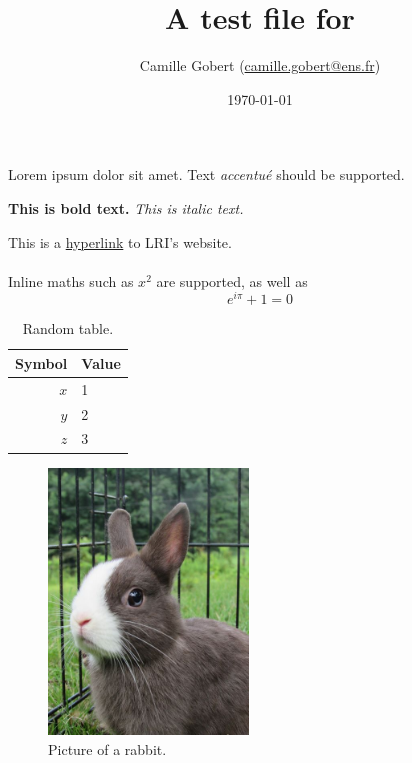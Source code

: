 \documentclass[11pt]{article}
\title{A test file for \iLaTeX}
\author{Camille Gobert (\url{camille.gobert@ens.fr})}
\date{\today}
\begin{document}
    \maketitle
    
    Lorem ipsum dolor sit amet.
    Text \emph{accentu\'e} should be supported.
    
    \textbf{This is bold text.}
    \textit{This is italic text.}
    
    This is a \href{https://www.lri.fr/}{hyperlink} to LRI's website.
    
    \paragraph{}
    Inline maths such as $x^2$ are supported, as well as 
    $$e^{i\pi} + 1 = 0$$
    
    \begin{table}[h]
        \centering
        \begin{tabular}{rl}
            \toprule
            \textbf{Symbol} & \textbf{Value} \\
            \midrule
            $x$ & 1 \\
            $y$ & 2 \\
            $z$ & 3 \\
            \bottomrule
        \end{tabular}
        \caption{Random table.}
        \label{tab:random}
    \end{table}
    
    \begin{figure}[h]
        \centering
        \includegraphics[width=201px, trim=0px 40px 38px 0px, clip]{img/rabbit.jpg}
        \caption{Picture of a rabbit.}
        \label{fig:rabbit}
    \end{figure}
    
    
    
\end{document}
